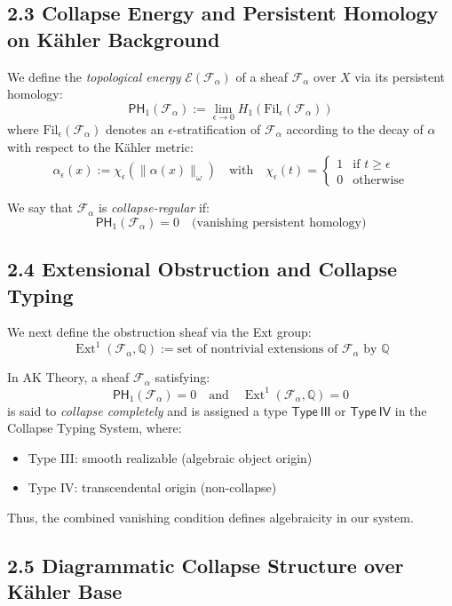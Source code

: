 \documentclass[11pt]{article}
\DeclareMathOperator{\Ext}{Ext}
\begin{document}
\subsection{2.3 Collapse Energy and Persistent Homology on Kähler Background}

We define the \emph{topological energy} $\mathcal{E}(\mathcal{F}_\alpha)$ of a sheaf $\mathcal{F}_\alpha$ over $X$ via its persistent homology:
\[
\mathsf{PH}_1(\mathcal{F}_\alpha) := \lim_{\epsilon \to 0} H_1(\mathrm{Fil}_\epsilon(\mathcal{F}_\alpha))
\]
where $\mathrm{Fil}_\epsilon(\mathcal{F}_\alpha)$ denotes an $\epsilon$-stratification of $\mathcal{F}_\alpha$ according to the decay of $\alpha$ with respect to the Kähler metric:
\[
\alpha_\epsilon(x) := \chi_\epsilon(\| \alpha(x) \|_\omega)
\quad \text{with} \quad \chi_\epsilon(t) = 
\begin{cases}
1 & \text{if } t \geq \epsilon \\
0 & \text{otherwise}
\end{cases}
\]

We say that $\mathcal{F}_\alpha$ is \emph{collapse-regular} if:
\[
\mathsf{PH}_1(\mathcal{F}_\alpha) = 0
\quad \text{(vanishing persistent homology)}
\]

\subsection{2.4 Extensional Obstruction and Collapse Typing}

We next define the obstruction sheaf via the Ext group:
\[
\Ext^1(\mathcal{F}_\alpha, \mathbb{Q}) := \text{set of nontrivial extensions of } \mathcal{F}_\alpha \text{ by } \mathbb{Q}
\]

In AK Theory, a sheaf $\mathcal{F}_\alpha$ satisfying:
\[
\mathsf{PH}_1(\mathcal{F}_\alpha) = 0 \quad \text{and} \quad \Ext^1(\mathcal{F}_\alpha, \mathbb{Q}) = 0
\]
is said to \emph{collapse completely} and is assigned a type $\mathsf{Type\ III}$ or $\mathsf{Type\ IV}$ in the Collapse Typing System, where:

\begin{itemize}
  \item Type III: smooth realizable (algebraic object origin)
  \item Type IV: transcendental origin (non-collapse)
\end{itemize}

Thus, the combined vanishing condition defines algebraicity in our system.

\subsection{2.5 Diagrammatic Collapse Structure over Kähler Base}
\end{document}
